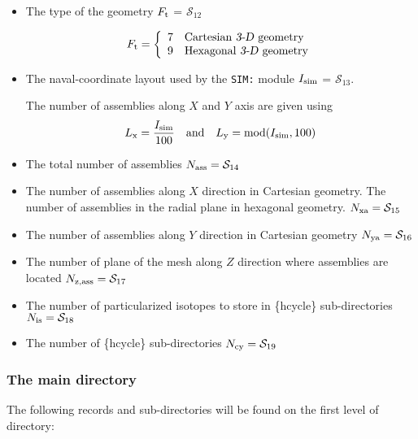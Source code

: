 \begin{itemize}
\item The type of the geometry $F_{\rm t}$ = $\mathcal{S}_{12}$

\begin{displaymath} F_{\rm t} = \left\{
\begin{array}{rl}
 7 & \textrm{Cartesian \dusa{3-D} geometry} \\
 9 & \textrm{Hexagonal \dusa{3-D} geometry} \\
\end{array} \right.
\end{displaymath}

\item The naval-coordinate layout used by the {\tt SIM:} module $I_{\rm sim}$ = $\mathcal{S}_{13}$.

\vskip 0.08cm

The number of assemblies along $X$ and $Y$ axis are given using
$$
L_{\rm x}={I_{\rm sim}\over 100} \ \ \ {\rm and} \ \ \ L_{\rm y}={\rm mod}(I_{\rm sim},100)
$$

\item The total number of assemblies $N_{\rm ass} = \mathcal{S}_{14}$

\item The number of assemblies along $X$ direction in Cartesian geometry.  The number of assemblies in the radial plane in hexagonal geometry. $N_{\rm xa} = \mathcal{S}_{15}$

\item The number of assemblies along $Y$ direction in Cartesian geometry $N_{\rm ya} = \mathcal{S}_{16}$

\item The number of plane of the mesh along $Z$ direction where assemblies are located $N_{\rm z,ass} = \mathcal{S}_{17}$

\item The number of particularized isotopes to store in \{hcycle\} sub-directories $N_{\rm is} = \mathcal{S}_{18}$

\item The number of \{hcycle\} sub-directories $N_{\rm cy} = \mathcal{S}_{19}$

\end{itemize}

\subsubsection{The main  directory}\label{sect:fmapdir}

\noindent
The following records and sub-directories will be found on the first level of 
directory:

